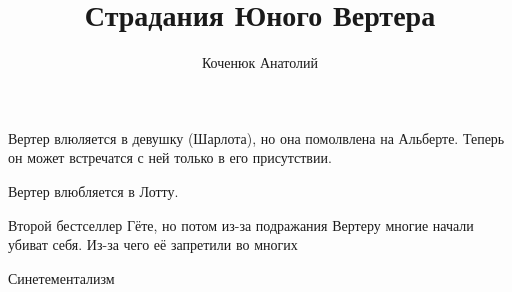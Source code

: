 \documentclass[10pt,a4paper]{article}
\author{Коченюк Анатолий}
\title{Страдания Юного Вертера}
\begin{document}
\maketitle
Вертер влюляется в девушку (Шарлота), но она помолвлена на Альберте. Теперь он может встречатся с ней только в его присутствии.

Вертер влюбляется в Лотту. 

Второй бестселлер Гёте, но потом из-за подражания Вертеру многие начали убиват себя. Из-за чего её запретили во многих 

Синетементализм 
\end{document}
